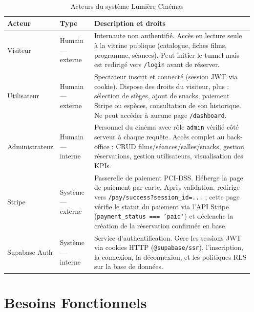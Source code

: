 \documentclass[12pt,a4paper,openany]{report}
\begin{document}
\begin{table}[H]
\centering
\small
\begin{tabularx}{\textwidth}{llX}
\toprule
\textbf{Acteur} & \textbf{Type} & \textbf{Description et droits} \\
\midrule
Visiteur       & Humain — externe & Internaute non authentifié. Accès en lecture seule à la vitrine publique (catalogue, fiches films, programme, séances). Peut initier le tunnel mais est redirigé vers \texttt{/login} avant de réserver. \\
Utilisateur    & Humain — externe & Spectateur inscrit et connecté (session JWT via cookie). Dispose des droits du visiteur, plus : sélection de sièges, ajout de snacks, paiement Stripe ou espèces, consultation de son historique. Ne peut accéder à aucune page \texttt{/dashboard}. \\
Administrateur & Humain — interne & Personnel du cinéma avec rôle \texttt{admin} vérifié côté serveur à chaque requête. Accès complet au back-office : CRUD films/séances/salles/snacks, gestion réservations, gestion utilisateurs, visualisation des KPIs. \\
Stripe         & Système — externe & Passerelle de paiement PCI-DSS. Héberge la page de paiement par carte. Après validation, redirige vers \texttt{/pay/success?session\_id=...} ; cette page vérifie le statut du paiement via l'API Stripe (\texttt{payment\_status === 'paid'}) et déclenche la création de la réservation confirmée en base. \\
Supabase Auth  & Système — interne & Service d'authentification. Gère les sessions JWT via cookies HTTP (\texttt{@supabase/ssr}), l'inscription, la connexion, la déconnexion, et les politiques RLS sur la base de données. \\
\bottomrule
\end{tabularx}
\caption{Acteurs du système Lumière Cinémas}
\label{tab:acteurs_rapport}
\end{table}

\section{Besoins Fonctionnels}
\end{document}
